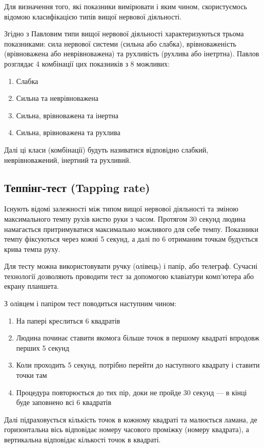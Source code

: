Для визначення того, які показники вимірювати і яким чином,
скористуємось відомою класифікацією типів вищої нервової діяльності.

Згідно з Павловим\cite{Pavlov:1973} типи вищої нервової діяльності
характеризуються трьома показниками: сила нервової системи (сильна або слабка),
врівноваженість (врівноважена або неврівноважена)
та рухливість (рухлива або інетртна).
Павлов розглядає 4 комбінації цих показників з 8 можливих:
\begin{enumerate}
  \item Слабка
  \item Сильна та неврівноважена
  \item Сильна, врівноважена та інертна
  \item Сильна, врівноважена та рухлива
\end{enumerate}
Далі ці класи (комбінації) будуть називатися відповідно слабкий,
неврівноважений, інертний та рухливий.

\subsection{Теппінг-тест (Tapping rate)}

Існують відомі залежності між типом вищої нервової діяльності та зміною
максимального темпу рухів кистю руки з часом.
Протягом 30 секунд людина намагається притримуватися максимально можливого для
себе темпу.
Показники темпу фіксуються через кожні 5 секунд, а далі по 6 отриманим точкам
будується крива темпа руху. \cite{Ilin:2001}

Для тесту можна використовувати ручку (олівець) і папір, або телеграф.
Сучасні технології дозволяють проводити тест за допомогою клавіатури комп’ютера
або екрану планшета.

З олівцем і папіром тест поводиться наступним чином:
\begin{enumerate}
  \item На папері креслиться 6 квадратів
  \item Людина починає ставити якомога більше точок в першому квадраті впродовж
    перших 5 секунд
  \item Коли проходить 5 секунд, потрібно перейти до наступного квадрату і
    ставити точки там
  \item Процедура повторюється до тих пір, доки не пройде 30 секунд --- в кінці
    буде заповнено всі 6 квадратів
\end{enumerate}
Далі підраховується кількість точок в кожному квадраті та малюється ламана, де
горизонтальна вісь відповідає номеру часового проміжку (номеру квадрата), а
вертикальна відповідає кількості точок в квадраті.

